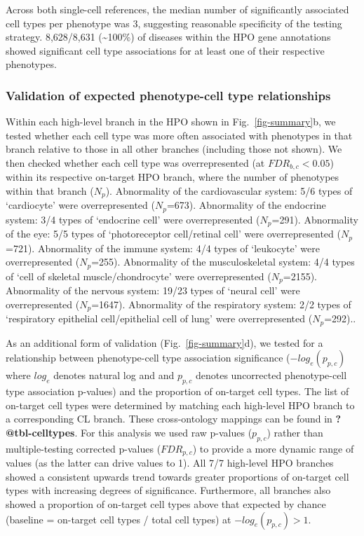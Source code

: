 \documentclass[
sn-nature
]{sn-jnl}
\begin{document}
Across both single-cell references, the median number of significantly
associated cell types per phenotype was 3, suggesting reasonable
specificity of the testing strategy. 8,628/8,631 (\textasciitilde100\%)
of diseases within the HPO gene annotations showed significant cell type
associations for at least one of their respective phenotypes.

\subsubsection{Validation of expected phenotype-cell type
relationships}\label{validation-of-expected-phenotype-cell-type-relationships}

Within each high-level branch in the HPO shown in
Fig.~\ref{fig-summary}b, we tested whether each cell type was more often
associated with phenotypes in that branch relative to those in all other
branches (including those not shown). We then checked whether each cell
type was overrepresented (at \(FDR_{b,c}<0.05\)) within its respective
on-target HPO branch, where the number of phenotypes within that branch
(\(N_{p}\)). Abnormality of the cardiovascular system: 5/6 types of
`cardiocyte' were overrepresented (\(N_{p}\)=673). Abnormality of the
endocrine system: 3/4 types of `endocrine cell' were overrepresented
(\(N_{p}\)=291). Abnormality of the eye: 5/5 types of `photoreceptor
cell/retinal cell' were overrepresented (\(N_{p}\)=721). Abnormality of
the immune system: 4/4 types of `leukocyte' were overrepresented
(\(N_{p}\)=255). Abnormality of the musculoskeletal system: 4/4 types of
`cell of skeletal muscle/chondrocyte' were overrepresented
(\(N_{p}\)=2155). Abnormality of the nervous system: 19/23 types of
`neural cell' were overrepresented (\(N_{p}\)=1647). Abnormality of the
respiratory system: 2/2 types of `respiratory epithelial cell/epithelial
cell of lung' were overrepresented (\(N_{p}\)=292)..

As an additional form of validation (Fig.~\ref{fig-summary}d), we tested
for a relationship between phenotype-cell type association significance
(\(-log_{e}(p_{p,c})\) where \(log_{e}\) denotes natural log and and
\(p_{p,c}\) denotes uncorrected phenotype-cell type association
p-values) and the proportion of on-target cell types. The list of
on-target cell types were determined by matching each high-level HPO
branch to a corresponding CL branch. These cross-ontology mappings can
be found in \textbf{?@tbl-celltypes}. For this analysis we used raw
p-values (\(p_{p,c}\)) rather than multiple-testing corrected p-values
(\(FDR_{p,c}\)) to provide a more dynamic range of values (as the latter
can drive values to 1). All 7/7 high-level HPO branches showed a
consistent upwards trend towards greater proportions of on-target cell
types with increasing degrees of significance. Furthermore, all branches
also showed a proportion of on-target cell types above that expected by
chance (baseline = on-target cell types / total cell types) at
\(-log_{e}(p_{p,c})>1\).
\end{document}
